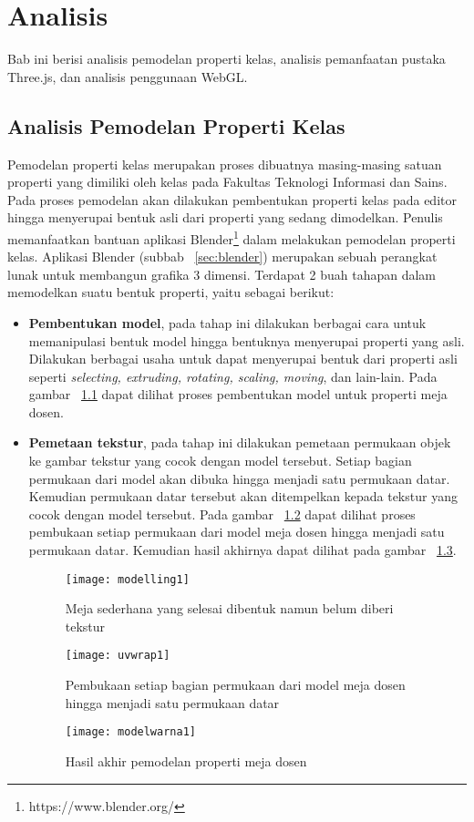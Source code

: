 \chapter{Analisis}
\label{chap:analisis}
Bab ini berisi analisis pemodelan properti kelas, analisis pemanfaatan pustaka Three.js, dan analisis penggunaan WebGL.

\section{Analisis Pemodelan Properti Kelas}
\label{sec:pemodelanproperti}
Pemodelan properti kelas merupakan proses dibuatnya masing-masing satuan properti yang dimiliki oleh kelas pada Fakultas Teknologi Informasi dan Sains. Pada proses pemodelan akan dilakukan pembentukan properti kelas pada editor hingga menyerupai bentuk asli dari properti yang sedang dimodelkan. Penulis memanfaatkan bantuan aplikasi Blender\footnote[1]{https://www.blender.org/} dalam melakukan pemodelan properti kelas. Aplikasi Blender (subbab ~\ref{sec:blender}) merupakan sebuah perangkat lunak untuk membangun grafika 3 dimensi. Terdapat 2 buah tahapan dalam memodelkan suatu bentuk properti, yaitu sebagai berikut:
\begin{itemize}
	\item {\bf Pembentukan model}, pada tahap ini dilakukan berbagai cara untuk memanipulasi bentuk model hingga bentuknya menyerupai properti yang asli. Dilakukan berbagai usaha untuk dapat menyerupai bentuk dari properti asli seperti {\it selecting, extruding, rotating, scaling, moving}, dan lain-lain. Pada gambar ~\ref{fig:modelling1} dapat dilihat proses pembentukan model untuk properti meja dosen.
	\item {\bf Pemetaan tekstur}, pada tahap ini dilakukan pemetaan permukaan objek ke gambar tekstur yang cocok dengan model tersebut. Setiap bagian permukaan dari model akan dibuka hingga menjadi satu permukaan datar. Kemudian permukaan datar tersebut akan ditempelkan kepada tekstur yang cocok dengan model tersebut. Pada gambar ~\ref{fig:uvwrap1} dapat dilihat proses pembukaan setiap permukaan dari model meja dosen hingga menjadi satu permukaan datar. Kemudian hasil akhirnya dapat dilihat pada gambar ~\ref{fig:modelwarna1}.
	\begin{figure}
		\centering
		\texttt{[image: modelling1]}
		\caption{Meja sederhana yang selesai dibentuk namun belum diberi tekstur}
		\label{fig:modelling1}
	\end{figure}
	\begin{figure}
		\centering
		\texttt{[image: uvwrap1]}
		\caption{Pembukaan setiap bagian permukaan dari model meja dosen hingga menjadi satu permukaan datar}
		\label{fig:uvwrap1}
	\end{figure}
	\begin{figure}
		\centering
		\texttt{[image: modelwarna1]}
		\caption{Hasil akhir pemodelan properti meja dosen}
		\label{fig:modelwarna1}
	\end{figure}
\end{itemize}

